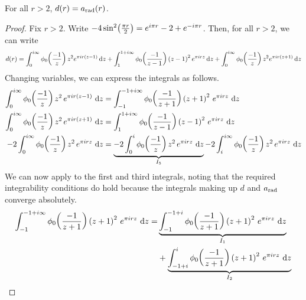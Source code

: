 \begin{boxproposition}\label{Ch4:Prop:a_eq_d}
    For all $r > 2$, $d(r) = a_{\operatorname{rad}}(r)$.
\end{boxproposition}
\begin{proof}
    Fix $r > 2$. Write $-4 \sin^2\!\left( \frac{\pi r}{2} \right) = e^{i \pi r} - 2 + e^{-i \pi r}$. Then, for all $r > 2$, we can write
    \begin{align} \small
         d(r)
         =
         \int_{0}^{i \infty} \phi_0\!\left( \frac{-1}{z} \right) z^2 e^{\pi i r \left( z - 1 \right)} \operatorname{d}\!{z}
         +
         \int_{1}^{1 + i \infty} \phi_0\!\left( \frac{-1}{z - 1} \right) \left( z - 1 \right)^2 e^{\pi i r z} \operatorname{d}\!{z}
         +
         \int_{0}^{i \infty} \phi_0\!\left( \frac{-1}{z} \right) z^2 e^{\pi i r \left( z + 1 \right)} \operatorname{d}\!{z}
         \label{Ch4:Eq:d_after_sinsq_trick}
    \end{align}
    Changing variables, we can express the integrals as follows.
    \begin{align*}
        \int_{0}^{i \infty} \phi_0\of{\frac{-1}{z}} z^2 \, e^{\pi i r \parenth{z - 1}} \, \diff{z}
        &=
        \int_{-1}^{-1 + i \infty} \phi_0\of{\frac{-1}{z + 1}} \parenth{z + 1}^2 \, e^{\pi i r z} \, \diff{z} \\
        \int_{0}^{i \infty} \phi_0\of{\frac{-1}{z}} z^2 \, e^{\pi i r \parenth{z + 1}} \, \diff{z}
        &=
        \int_{1}^{1 + i \infty} \phi_0\of{\frac{-1}{z - 1}} \parenth{z - 1}^2 \, e^{\pi i r z} \, \diff{z} \\
        -2 \int_{0}^{i \infty} \phi_0\of{\frac{-1}{z}} z^2 \, e^{\pi i r z} \, \diff{z}
        &=
        \underbrace{-2 \int_{0}^{i} \phi_0\of{\frac{-1}{z}} z^2 \, e^{\pi i r z} \, \diff{z}}_{I_5}
        -2 \int_{i}^{i \infty} \phi_0\of{\frac{-1}{z}} z^2 \, e^{\pi i r z} \, \diff{z} %
    \end{align*}
    We can now apply  to the first and third integrals, noting that the required integrability conditions do hold because the integrals making up $d$ and $a_{\operatorname{rad}}$ converge absolutely.
    \begin{align*}
        \int_{-1}^{-1 + i \infty} \phi_0\of{\frac{-1}{z + 1}} \parenth{z + 1}^2 \, e^{\pi i r z} \, \diff{z}
        =& \underbrace{\int_{-1}^{-1 + i} \phi_0\of{\frac{-1}{z + 1}} \parenth{z + 1}^2 \, e^{\pi i r z} \, \diff{z}}_{I_1} \\
        &+ \underbrace{\int_{-1 + i}^{i} \phi_0\of{\frac{-1}{z + 1}} \parenth{z + 1}^2 \, e^{\pi i r z} \, \diff{z}}_{I_2} \\

\end{align*}
\end{proof}
